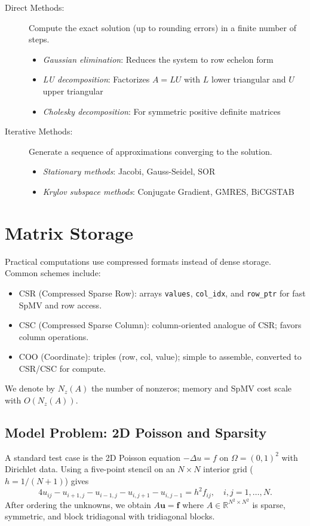 \documentclass[../../main.tex]{subfiles}
\begin{document}
\begin{description}
    \item[Direct Methods:] Compute the exact solution (up to rounding errors) in a finite number of steps.
          \begin{itemize}
              \item \emph{Gaussian elimination}: Reduces the system to row echelon form
              \item \emph{LU decomposition}: Factorizes $A = LU$ with $L$ lower triangular and $U$ upper triangular
              \item \emph{Cholesky decomposition}: For symmetric positive definite matrices
          \end{itemize}

    \item[Iterative Methods:] Generate a sequence of approximations converging to the solution.
          \begin{itemize}
              \item \emph{Stationary methods}: Jacobi, Gauss-Seidel, SOR
              \item \emph{Krylov subspace methods}: Conjugate Gradient, GMRES, BiCGSTAB
          \end{itemize}
\end{description}

\section{Matrix Storage}
Practical computations use compressed formats instead of dense storage. Common schemes include:
\begin{itemize}
    \item CSR (Compressed Sparse Row): arrays \texttt{values}, \texttt{col\_idx}, and \texttt{row\_ptr} for fast SpMV and row access.
    \item CSC (Compressed Sparse Column): column-oriented analogue of CSR; favors column operations.
    \item COO (Coordinate): triples (row, col, value); simple to assemble, converted to CSR/CSC for compute.
\end{itemize}
We denote by $N_z(A)$ the number of nonzeros; memory and SpMV cost scale with $O(N_z(A))$.


\subsection{Model Problem: 2D Poisson and Sparsity}
A standard test case is the 2D Poisson equation $-\Delta u=f$ on $\Omega=(0,1)^2$ with Dirichlet data. Using a five-point stencil on an $N\times N$ interior grid ($h=1/(N+1)$) gives
\[
    4u_{ij} - u_{i+1,j} - u_{i-1,j} - u_{i,j+1} - u_{i,j-1} = h^2 f_{ij},\quad i,j=1,\dots,N.
\]
After ordering the unknowns, we obtain $A\mathbf{u}=\mathbf{f}$ where $A\in\mathbb{R}^{N^2\times N^2}$ is sparse, symmetric, and block tridiagonal with tridiagonal blocks.
\end{document}
